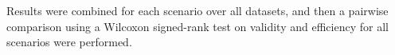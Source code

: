 \documentclass[preprint,12pt,authoryear]{elsarticle}
\begin{document}
%


%


Results were combined for each scenario over all datasets, and then a pairwise comparison using a Wilcoxon signed-rank test on validity and efficiency for all scenarios were performed.


\end{document}
